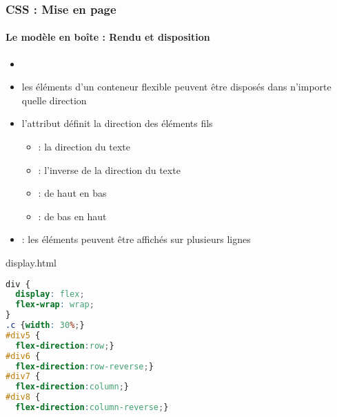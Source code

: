 \documentclass[xcolor=table]{beamer}
\begin{document}
\begin{frame}[fragile]
\frametitle{CSS : Mise en page}
\framesubtitle{Le modèle en boîte : Rendu et disposition}

\begin{minipage}{0.60\textwidth}
	\begin{itemize}
		\item {}
		\item les éléments d'un conteneur flexible peuvent être disposés dans n'importe quelle direction
		\item l'attribut  définit la direction des éléments fils
		\begin{itemize}
			\item {} : la direction du texte
			\item {} : l'inverse de la direction du texte
			\item {} : de haut en bas
			\item {} : de bas en haut
		\end{itemize}
	\item {} : les éléments peuvent être affichés sur plusieurs lignes 
	\end{itemize}
\end{minipage}
%
\begin{minipage}{0.38\textwidth}
\begin{block}{display.html}
\lstset{escapeinside=**}
\tiny\bfseries
\begin{lstlisting}[language={CSS}]
div {
  display: flex;
  flex-wrap: wrap;
}
.c {width: 30%;}
#div5 {
  flex-direction:row;}
#div6 {
  flex-direction:row-reverse;}
#div7 {
  flex-direction:column;}
#div8 {
  flex-direction:column-reverse;}
\end{lstlisting}
\end{block}
\end{minipage}
\end{frame}
\end{document}
